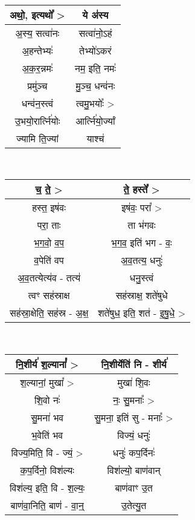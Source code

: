 {\centering
{\small {}} \\
\begin{longtable}{|c|c|}
\hline
अथो॒, इत्यथो᳚ >              & ये अ॑स्य\\
\hline
अ॒स्य॒ सत्वा॑नः               & सत्वा॑नो॒ऽहं\\
\hline
अ॒हन्तेभ्यः॑                  & तेभ्यो॑ऽकरं\\
\hline
अ॒क॒र॒न्नमः॑                  & नम॒ इति॒ नमः॑\\
\hline
प्रमु॑ञ्च                    & मु॒ञ्च॒ धन्व॑नः\\
\hline
धन्व॑न॒स्त्वं                  & त्वमु॒भयोः᳚ >\\
\hline
उ॒भयो॒रार्त्नि॑योः            & आर्त्नि॑यो॒र्ज्यां\\
\hline
ज्यामि ति॒ज्यां               & याश्च॑\\
\hline
\end{longtable}
}
{\centering
{\small {}} \\
\begin{longtable}{|c|c|}
\hline
च॒ ते॒ >                    & ते॒ हस्ते᳚ >\\
\hline
हस्त॒ इष॑वः                 & इष॑वः॒ परा᳚ >\\
\hline
परा॒ ताः                  & ता भ॑गवः\\
\hline
भ॒ग॒वो॒ व॒प॒                  & भ॒ग॒व॒ इति॑ भग - वः॒\\
\hline
व॒पेति॑ वप                  & अ॒व॒तत्य॒ धनुः॑\\
\hline
अ॒व॒तत्येत्य॑व - तत्य॑           & धनु॒स्त्वं\\
\hline
त्वꣳ सह॑स्राक्ष              & सह॑स्राक्ष॒ शते॑षुधे\\
\hline
सह॑स्रा॒क्षेति॒ सह॑स्र - अ॒क्ष॒     & शते॑षुध॒ इति॒ शत॑ - इ॒षु॒धे॒ >\\
\hline
\end{longtable}
}
{\centering
{\small {}} \\
\begin{longtable}{|c|c|}
\hline
नि॒शीर्य॑ श॒ल्यानां᳚ >          & नि॒शीर्येति॑ नि - शीर्य॑\\
\hline
श॒ल्यानां॒ मुखा᳚ >             & मुखा॑ शि॒वः\\
\hline
शि॒वो नः॑                  & नः॒ सु॒मनाः᳚ >\\
\hline
सु॒मना॑ भव                  & सु॒मना॒ इति॑ सु - मनाः᳚ >\\
\hline
भ॒वेति॑ भव                  & विज्यं॒ धनुः॑\\
\hline
विज्य॒मिति॒ वि - ज्यं॒ >       & धनुः॑ कप॒र्दिनः॑\\
\hline
क॒प॒र्दिनो॒ विश॑ल्यः           & विश॑ल्यो॒ बाण॑वान्\\
\hline
विश॑ल्य॒ इति॒ वि - श॒ल्यः॒      & बाण॑वाꣳ उ॒त\\
\hline
बाण॑वा॒निति॒ बाण॑ - वा॒न्॒      & उ॒तेत्यु॒त\\
\hline
\end{longtable}
}
